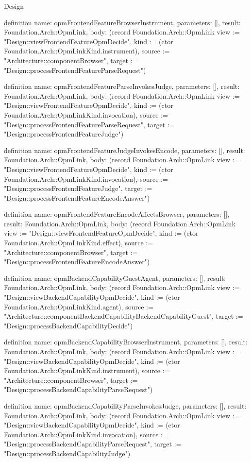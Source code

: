 \begin{lexlean}{Design}
\begin{semanticmodule}
definition{
  name: opmFrontendFeatureBrowserInstrument,
  parameters: [],
  result: Foundation.Arch::OpmLink,
  body: (record Foundation.Arch::OpmLink {view := "Design::viewFrontendFeatureOpmDecide", kind := (ctor Foundation.Arch::OpmLinkKind.instrument), source := "Architecture::componentBrowser", target := "Design::processFrontendFeatureParseRequest"})
}

definition{
  name: opmFrontendFeatureParseInvokesJudge,
  parameters: [],
  result: Foundation.Arch::OpmLink,
  body: (record Foundation.Arch::OpmLink {view := "Design::viewFrontendFeatureOpmDecide", kind := (ctor Foundation.Arch::OpmLinkKind.invocation), source := "Design::processFrontendFeatureParseRequest", target := "Design::processFrontendFeatureJudge"})
}

definition{
  name: opmFrontendFeatureJudgeInvokesEncode,
  parameters: [],
  result: Foundation.Arch::OpmLink,
  body: (record Foundation.Arch::OpmLink {view := "Design::viewFrontendFeatureOpmDecide", kind := (ctor Foundation.Arch::OpmLinkKind.invocation), source := "Design::processFrontendFeatureJudge", target := "Design::processFrontendFeatureEncodeAnswer"})
}

definition{
  name: opmFrontendFeatureEncodeAffectsBrowser,
  parameters: [],
  result: Foundation.Arch::OpmLink,
  body: (record Foundation.Arch::OpmLink {view := "Design::viewFrontendFeatureOpmDecide", kind := (ctor Foundation.Arch::OpmLinkKind.effect), source := "Architecture::componentBrowser", target := "Design::processFrontendFeatureEncodeAnswer"})
}

definition{
  name: opmBackendCapabilityGuestAgent,
  parameters: [],
  result: Foundation.Arch::OpmLink,
  body: (record Foundation.Arch::OpmLink {view := "Design::viewBackendCapabilityOpmDecide", kind := (ctor Foundation.Arch::OpmLinkKind.agent), source := "Architecture::componentBackendCapabilityBackendCapabilityGuest", target := "Design::processBackendCapabilityDecide"})
}

definition{
  name: opmBackendCapabilityBrowserInstrument,
  parameters: [],
  result: Foundation.Arch::OpmLink,
  body: (record Foundation.Arch::OpmLink {view := "Design::viewBackendCapabilityOpmDecide", kind := (ctor Foundation.Arch::OpmLinkKind.instrument), source := "Architecture::componentBrowser", target := "Design::processBackendCapabilityParseRequest"})
}

definition{
  name: opmBackendCapabilityParseInvokesJudge,
  parameters: [],
  result: Foundation.Arch::OpmLink,
  body: (record Foundation.Arch::OpmLink {view := "Design::viewBackendCapabilityOpmDecide", kind := (ctor Foundation.Arch::OpmLinkKind.invocation), source := "Design::processBackendCapabilityParseRequest", target := "Design::processBackendCapabilityJudge"})
}


\end{semanticmodule}
\end{lexlean}

